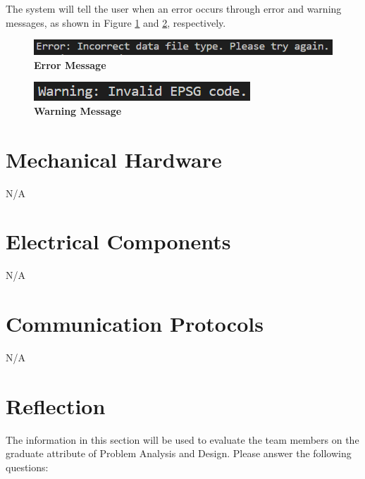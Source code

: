 \documentclass[12pt, titlepage]{article}
\begin{document}
The system will tell the user when an error occurs through error and warning messages, as shown in Figure \ref{fig:error} and \ref{fig:warning}, respectively.
\begin{figure}[H]
    \centering
    \includegraphics[scale=0.55]{error.png}
    \caption{\bf Error Message}
    \label{fig:error}
\end{figure}

\begin{figure}[H]
    \centering
    \includegraphics[scale=0.55]{warning.png}
    \caption{\bf Warning Message}
    \label{fig:warning}
\end{figure}

\section{Mechanical Hardware}
N/A

\section{Electrical Components}
N/A

\section{Communication Protocols}
N/A

\section{Reflection}

The information in this section will be used to evaluate the team members on the
graduate attribute of Problem Analysis and Design.  Please answer the following questions:
\end{document}
